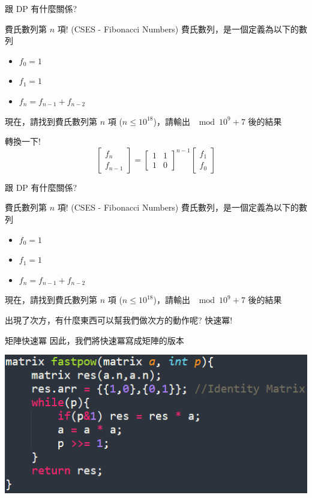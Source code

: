 \documentclass[aspectratio=169]{beamer}
\begin{document}
\begin{frame}[fragile]{跟 DP 有什麼關係?}
    \begin{block}{費氏數列第 $n$ 項! (CSES - Fibonacci Numbers)}
        費氏數列，是一個定義為以下的數列
        \begin{itemize}
            \item $f_0 = 1$
            \item $f_1 = 1$
            \item $f_n = f_{n-1}+f_{n-2}$
        \end{itemize}
        現在，請找到費氏數列第 $n$ 項 ($n \le 10^{18}$)，請輸出 $\mod 10^9+7$ 後的結果
    \end{block}
    轉換一下!
    $$\begin{bmatrix}f_{n} \\ f_{n-1} \end{bmatrix} = \begin{bmatrix}1 & 1 \\ 1 & 0 \end{bmatrix}^{n-1} \begin{bmatrix}f_1 \\ f_0 \end{bmatrix}$$
\end{frame}

\begin{frame}[fragile]{跟 DP 有什麼關係?}
    \begin{block}{費氏數列第 $n$ 項! (CSES - Fibonacci Numbers)}
        費氏數列，是一個定義為以下的數列
        \begin{itemize}
            \item $f_0 = 1$
            \item $f_1 = 1$
            \item $f_n = f_{n-1}+f_{n-2}$
        \end{itemize}
        現在，請找到費氏數列第 $n$ 項 ($n \le 10^{18}$)，請輸出 $\mod 10^9+7$ 後的結果
    \end{block}
    出現了次方，有什麼東西可以幫我們做次方的動作呢? \pause
    快速冪!
\end{frame}


\begin{frame}[fragile]{矩陣快速冪}
    因此，我們將快速冪寫成矩陣的版本
    \begin{center}
        \includegraphics[scale=0.7]{images/matrix_exponentiation.png}
    \end{center}
\end{frame}
\end{document}
